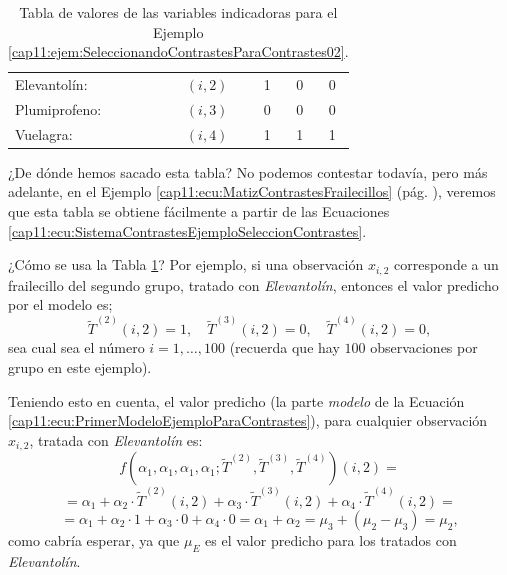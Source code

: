 \begin{ejemplo}
\begin{table}[hbtp]
\begin{center}
\begin{tabular}{lc|c|c|c|}
\cline{2-5}
\mbox{Elevantolín:}&\multicolumn{1}{|c|}{ $(i,2)$}&1&0&0 \\
\cline{2-5}
\mbox{Plumiprofeno:}&\multicolumn{1}{|c|}{ $(i,3)$}&0&0&0 \\
\cline{2-5}
\mbox{Vuelagra:}&\multicolumn{1}{|c|}{ $(i,4)$}&1&1&1 \\
\cline{2-5}
\end{tabular}
\end{center}
\caption{Tabla de valores de las variables indicadoras para el Ejemplo \ref{cap11:ejem:SeleccionandoContrastesParaContrastes02}.}
\label{cap11:tabla:VariablesIndicadorasEjemploSeleccionandoContrastes02}
\end{table}

¿De dónde hemos sacado esta tabla? No podemos contestar todavía, pero más adelante, en el Ejemplo \ref{cap11:ecu:MatizContrastesFrailecillos} (pág. \pageref{cap11:ecu:MatizContrastesFrailecillos}), veremos que esta tabla se obtiene fácilmente a partir de las Ecuaciones \ref{cap11:ecu:SistemaContrastesEjemploSeleccionContrastes}.

¿Cómo se usa la Tabla \ref{cap11:tabla:VariablesIndicadorasEjemploSeleccionandoContrastes02}? Por ejemplo, si una observación $x_{i,2}$ corresponde a un frailecillo del segundo grupo, tratado con {\em Elevantolín}, entonces el valor predicho por el modelo es;
\[\tilde{T}^{(2)}(i,2)=1,\quad  \tilde{T}^{(3)}(i,2)=0,\quad  \tilde{T}^{(4)}(i,2)=0,\]
sea cual sea el número $i=1,\ldots, 100$ (recuerda que hay $100$ observaciones por grupo en este ejemplo).

Teniendo esto  en cuenta,  el valor predicho (la parte {\em modelo} de la Ecuación \ref{cap11:ecu:PrimerModeloEjemploParaContrastes}), para cualquier observación $x_{i,2}$, tratada con {\em Elevantolín} es:
\[f(\alpha_1,\alpha_1,\alpha_1,\alpha_1;\tilde{T}^{(2)},\tilde{T}^{(3)},\tilde{T}^{(4)})(i,2)=\]
\[=\alpha_1 + \alpha_2\cdot \tilde{T}^{(2)}(i,2)+\alpha_3\cdot \tilde{T}^{(3)}(i,2)+\alpha_4\cdot \tilde{T}^{(4)}(i,2)=\]
\[
=\alpha_1+\alpha_2\cdot 1+\alpha_3\cdot 0+\alpha_4\cdot 0=\alpha_1+\alpha_2=\mu_3+(\mu_2-\mu_3)=\mu_2,
\]
como cabría esperar, ya que $\mu_E$ es el valor predicho para los tratados con {\em Elevantolín}.


\end{ejemplo}

